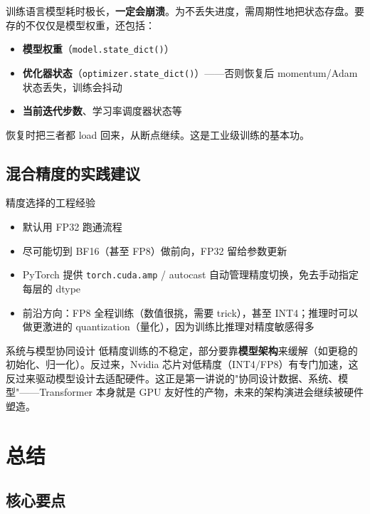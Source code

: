 \documentclass[a4paper]{article}
\begin{document}
训练语言模型耗时极长，\textbf{一定会崩溃}。为不丢失进度，需周期性地把状态存盘。要存的不仅仅是模型权重，还包括：
\begin{itemize}
\item \textbf{模型权重}（\texttt{model.state\_dict()}）
\item \textbf{优化器状态}（\texttt{optimizer.state\_dict()}）——否则恢复后 momentum/Adam 状态丢失，训练会抖动
\item \textbf{当前迭代步数}、学习率调度器状态等
\end{itemize}

恢复时把三者都 load 回来，从断点继续。这是工业级训练的基本功。

\subsection{混合精度的实践建议}

\begin{practicebox}{精度选择的工程经验}
\begin{itemize}
\item 默认用 FP32 跑通流程
\item 尽可能切到 BF16（甚至 FP8）做前向，FP32 留给参数更新
\item PyTorch 提供 \texttt{torch.cuda.amp} / autocast 自动管理精度切换，免去手动指定每层的 dtype
\item 前沿方向：FP8 全程训练（数值很挑，需要 trick），甚至 INT4；推理时可以做更激进的 quantization（量化），因为训练比推理对精度敏感得多
\end{itemize}
\end{practicebox}

\begin{knowledgebox}{系统与模型协同设计}
低精度训练的不稳定，部分要靠\textbf{模型架构}来缓解（如更稳的初始化、归一化）。反过来，Nvidia 芯片对低精度（INT4/FP8）有专门加速，这反过来驱动模型设计去适配硬件。这正是第一讲说的"协同设计数据、系统、模型"——Transformer 本身就是 GPU 友好性的产物，未来的架构演进会继续被硬件塑造。
\end{knowledgebox}

\section{总结}

\subsection{核心要点}
\end{document}
